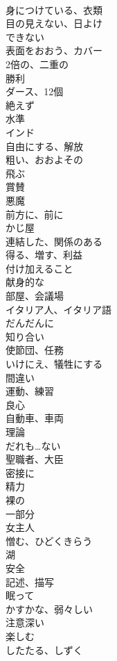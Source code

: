 \documentclass[8pt]{extreport}
\begin{document}
\begin{CJK}{UTF8}{min}
\\	身につけている、衣類
\\	目の見えない、日よけ
\\	できない
\\	表面をおおう、カバー
\\	2倍の、二重の
\\	勝利
\\	ダース、12個
\\	絶えず
\\	水準
\\	インド
\\	自由にする、解放
\\	粗い、おおよその
\\	飛ぶ
\\	賞賛
\\	悪魔
\\	前方に、前に
\\	かじ屋
\\	連結した、関係のある
\\	得る、増す、利益
\\	付け加えること
\\	献身的な
\\	部屋、会議場
\\	イタリア人、イタリア語
\\	だんだんに
\\	知り合い
\\	使節団、任務
\\	いけにえ、犠牲にする
\\	間違い
\\	運動、練習
\\	良心
\\	自動車、車両
\\	理論
\\	だれも…ない
\\	聖職者、大臣
\\	密接に
\\	精力
\\	裸の
\\	一部分
\\	女主人
\\	憎む、ひどくきらう
\\	湖
\\	安全
\\	記述、描写
\\	眠って
\\	かすかな、弱々しい
\\	注意深い
\\	楽しむ
\\	したたる、しずく

\end{CJK}
\end{document}
